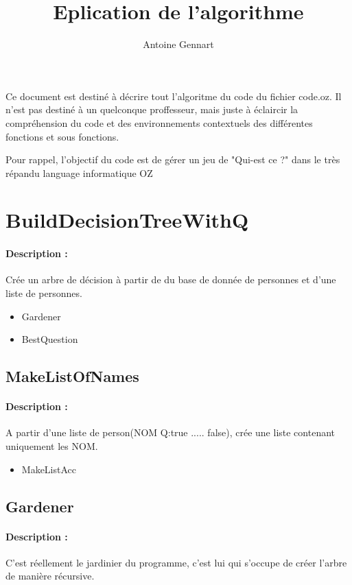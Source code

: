 \documentclass[10pt,a4paper]{article}
\author{Antoine Gennart}
\title{Eplication de l'algorithme}
\begin{document}
\maketitle

Ce document est destiné à décrire tout l'algoritme du code du fichier code.oz. Il n'est pas destiné à un quelconque proffesseur, mais juste à éclaircir la compréhension du code et des environnements contextuels des différentes fonctions et sous fonctions.

Pour rappel, l'objectif du code est de gérer un jeu de "Qui-est ce ?" dans le très répandu language informatique OZ

\tableofcontents

\section{BuildDecisionTreeWithQ}
\paragraph{Description :} Crée un arbre de décision à partir de du base de donnée de personnes et d'une liste de personnes.

\begin{itemize}
\item Gardener
\item BestQuestion
\end{itemize}

\subsection{MakeListOfNames}
\paragraph{Description :} A partir d'une liste de person(NOM Q:true ..... false), crée une liste contenant uniquement les NOM.

\begin{itemize}
\item MakeListAcc
\end{itemize}

\subsection{Gardener}
\paragraph{Description :} C'est réellement le jardinier du programme, c'est lui qui s'occupe de créer l'arbre de manière récursive.
\end{document}
